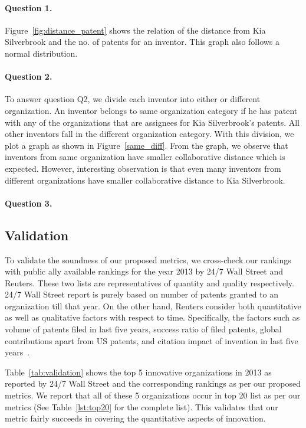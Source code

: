 \paragraph{Question 1.}
Figure~\ref{fig:distance_patent} shows the relation of the distance from
Kia Silverbrook and the no. of patents for an inventor. This graph also follows a
normal distribution.

\paragraph{Question 2.}
To answer question Q2, we divide each inventor into either
or different organization. An inventor belongs to 
 same organization category if he has patent with any of the organizations that are 
assignees for Kia Silverbrook's patents. All other inventors fall in the different
organization category. With this division, we plot a graph as shown in Figure~\ref{same_diff}.
From the graph, we observe that inventors from same organization have
smaller collaborative distance which is expected. However, interesting observation is that
even many inventors from different organizations have smaller collaborative distance to Kia Silverbrook. 

\paragraph{Question 3.}


\subsection{Validation}

To validate the soundness of our proposed metrics, we cross-check our rankings
with public ally available rankings for the year 2013 by 24/7 Wall Street and
Reuters. These two lists are representatives of quantity and quality
respectively.  24/7 Wall Street report is purely based on number of patents
granted to an organization till that year.  On the other hand, Reuters
consider both quantitative as well as qualitative factors with respect to
time. Specifically, the factors such as volume of patents filed in last five
years, success ratio of filed patents, global contributions apart from US
patents, and citation impact of invention in last five years~\cite{reuters-method}.

Table~\ref{tab:validation} shows the top 5 innovative organizations in 2013 as
reported by 24/7 Wall Street and the corresponding rankings as per our
proposed metrics. We report that all of these 5 organizations occur in top 20
list as per our metrics (See Table~\ref{lst:top20} for the complete list).
This validates that our metric fairly succeeds in covering the quantitative
aspects of innovation.

